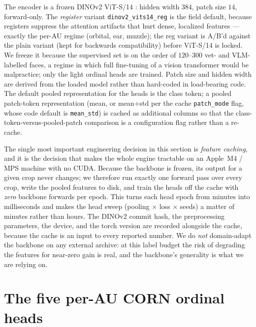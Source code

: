 The encoder is a frozen DINOv2 ViT-S/14 \citep{oquab2023dinov2}: hidden width
$384$, patch size $14$, forward-only. The \emph{register} variant
\texttt{dinov2\_vits14\_reg} is the field default, because registers suppress the
attention artifacts that hurt dense, localized features --- exactly the per-AU
regime (orbital, ear, muzzle); the reg variant is A/B'd against the plain variant
(kept for backwards compatibility) before ViT-S/14 is locked. We freeze it because the supervised set is
on the order of $120$--$300$ vet- and VLM-labelled faces, a regime in which
full fine-tuning of a vision transformer would be malpractice; only the light
ordinal heads are trained. Patch size and hidden width are derived from the
loaded model rather than hard-coded in load-bearing code. The default pooled
representation for the heads is the class token; a pooled patch-token
representation (mean, or mean$+$std per the cache \texttt{patch\_mode} flag,
whose code default is \texttt{mean\_std}) is cached as additional columns so that
the class-token-versus-pooled-patch comparison is a configuration flag rather
than a re-cache.

The single most important engineering decision in this section is
\emph{feature caching}, and it is the decision that makes the whole engine
tractable on an Apple~M4 / MPS machine with no CUDA. Because the backbone is
frozen, its output for a given crop never changes; we therefore run exactly one
forward pass over every crop, write the pooled features to disk, and train the
heads off the cache with \emph{zero} backbone forwards per epoch. This turns
each head epoch from minutes into milliseconds and makes the head sweep
(pooling $\times$ loss $\times$ seeds) a matter of minutes rather than hours.
The DINOv2 commit hash, the preprocessing parameters, the device, and the torch
version are recorded alongside the cache, because the cache is an input to every
reported number. We do \emph{not} domain-adapt the backbone on any external
archive: at this label budget the risk of degrading the features for near-zero
gain is real, and the backbone's generality is what we are relying on.

\section{The five per-AU CORN ordinal heads}
\label{sec:eng-corn}

